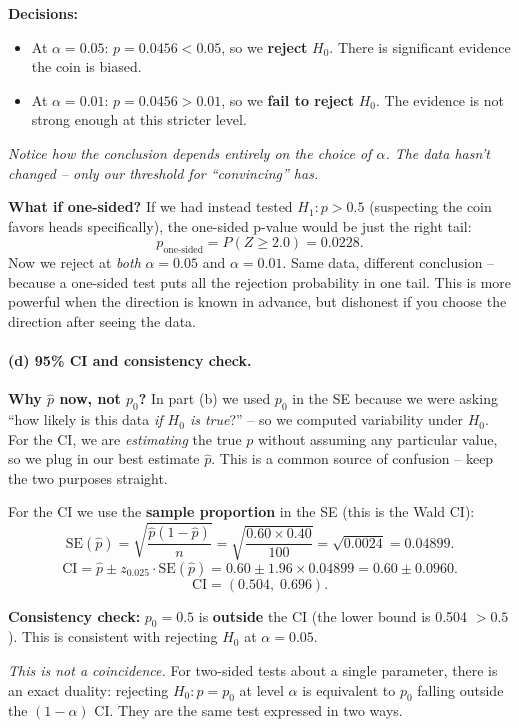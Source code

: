 \documentclass[11pt]{article}
\newcommand{\phat}{\hat{p}}
\begin{document}
\textbf{Decisions:}
\begin{itemize}
  \item At $\alpha = 0.05$: $p = 0.0456 < 0.05$, so we \textbf{reject} $H_0$. There is significant evidence the coin is biased.
  \item At $\alpha = 0.01$: $p = 0.0456 > 0.01$, so we \textbf{fail to reject} $H_0$. The evidence is not strong enough at this stricter level.
\end{itemize}

\textit{Notice how the conclusion depends entirely on the choice of $\alpha$. The data hasn't changed -- only our threshold for ``convincing'' has.}

\textbf{What if one-sided?} If we had instead tested $H_1\colon p > 0.5$ (suspecting the coin favors heads specifically), the one-sided p-value would be just the right tail:
\[
  p_{\text{one-sided}} = P(Z \geq 2.0) = 0.0228.
\]
Now we reject at \textit{both} $\alpha = 0.05$ and $\alpha = 0.01$. Same data, different conclusion -- because a one-sided test puts all the rejection probability in one tail. This is more powerful when the direction is known in advance, but dishonest if you choose the direction after seeing the data.

\paragraph{(d) 95\% CI and consistency check.}

\textbf{Why $\phat$ now, not $p_0$?} In part (b) we used $p_0$ in the SE because we were asking ``how likely is this data \textit{if $H_0$ is true}?'' -- so we computed variability under $H_0$. For the CI, we are \textit{estimating} the true $p$ without assuming any particular value, so we plug in our best estimate $\phat$. This is a common source of confusion -- keep the two purposes straight.

For the CI we use the \textbf{sample proportion} in the SE (this is the Wald CI):
\[
  \text{SE}(\phat) = \sqrt{\frac{\phat(1-\phat)}{n}} = \sqrt{\frac{0.60 \times 0.40}{100}} = \sqrt{0.0024} = 0.04899.
\]
\[
  \text{CI} = \phat \pm z_{0.025} \cdot \text{SE}(\phat) = 0.60 \pm 1.96 \times 0.04899 = 0.60 \pm 0.0960.
\]
\[
  \boxed{\text{CI} = (0.504,\; 0.696)}.
\]

\textbf{Consistency check:} $p_0 = 0.5$ is \textbf{outside} the CI (the lower bound is 0.504 $> 0.5$). This is consistent with rejecting $H_0$ at $\alpha = 0.05$.

\textit{This is not a coincidence.} For two-sided tests about a single parameter, there is an exact duality: rejecting $H_0\colon p = p_0$ at level $\alpha$ is equivalent to $p_0$ falling outside the $(1-\alpha)$ CI. They are the same test expressed in two ways.
\end{document}
